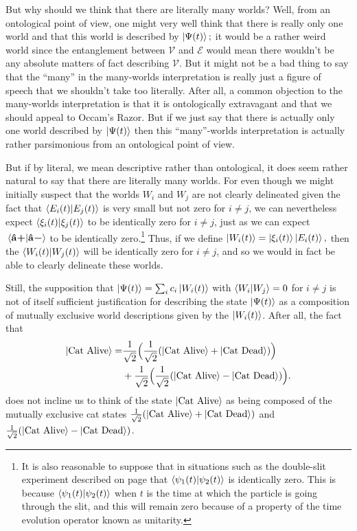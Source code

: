     But why should we think that there are literally many worlds? Well, from an ontological point of view, one might very well think that there is really only one world and that this world is described by $\ket{\Psi(t)};$ it would be a rather weird world since the entanglement between $\mathcal{V}$ and $\mathcal{E}$ would mean there wouldn't be any absolute matters of fact describing $\mathcal{V}$. But it might not be a bad thing to say that the ``many'' in the many-worlds interpretation is really just a figure of speech that we shouldn't take too literally. After all, a common objection to the many-worlds interpretation is that it is ontologically extravagant and that we should appeal to Occam's Razor. But if we just say that there is actually only one world described by $\ket{\Psi(t)}$ then this ``many''-worlds interpretation is actually rather parsimonious from an ontological point of view. 
    
    But if by literal, we mean descriptive rather than ontological, it does seem rather natural to say that there are literally many worlds. For even though we might initially suspect that the worlds $W_i$ and $W_j$ are not clearly delineated given the fact that $\ip{E_i(t)}{E_j(t)}$ is very small but not zero for $i\neq j$, we can nevertheless expect $\ip{\xi_i(t)}{\xi_j(t)}$ to be identically zero for $i\neq j$, just as we can expect $\ip*{\uvbp{a}}{\uvbm{a}}$ to be identically zero.\footnote{It is also reasonable to suppose that in situations such as the double-slit experiment described on page \pageref{psi_slit} that $\ip{\psi_1(t)}{\psi_2(t)}$ is identically zero. This is because $\ip{\psi_1(t)}{\psi_2(t)}$ when $t$ is the time at which the particle is going through the slit, and this will remain zero because of a property of the time evolution operator known as unitarity.} Thus, if we define $\ket{W_i(t)}=\ket{\xi_i(t)}\ket{E_i(t)},$ then the $\ip{W_i(t)}{W_j(t)}$ will be identically zero for $i\neq j$, and so we would in fact be able to clearly delineate these worlds.
    
    Still, the supposition that $\ket{\Psi(t)}= \sum_i c_i\ket{W_i(t)}$  with $\ip{W_i}{W_j}=0$ for $i\neq j$ is not of itself sufficient justification for describing the state $\ket{\Psi(t)}$ as a composition of mutually exclusive world descriptions given by the $\ket{W_i(t)}$. After all, the fact that
    \begin{align*}\ket{\text{Cat Alive}}= &\frac{1}{\sqrt{2}}\Big(\frac{1}{\sqrt{2}}(\ket{\text{Cat Alive}}+\ket{\text{Cat Dead}})\Big)\\&+\frac{1}{\sqrt{2}}\Big( \frac{1}{\sqrt{2}}(\ket{\text{Cat Alive}}-\ket{\text{Cat Dead}})\Big). \end{align*} does not incline us to think of the state $\ket{\text{Cat Alive}}$ as being composed of the mutually exclusive cat states  $\frac{1}{\sqrt{2}}(\ket{\text{Cat Alive}}+\ket{\text{Cat Dead}})$ and $\frac{1}{\sqrt{2}}(\ket{\text{Cat Alive}}-\ket{\text{Cat Dead}})$. 
    
